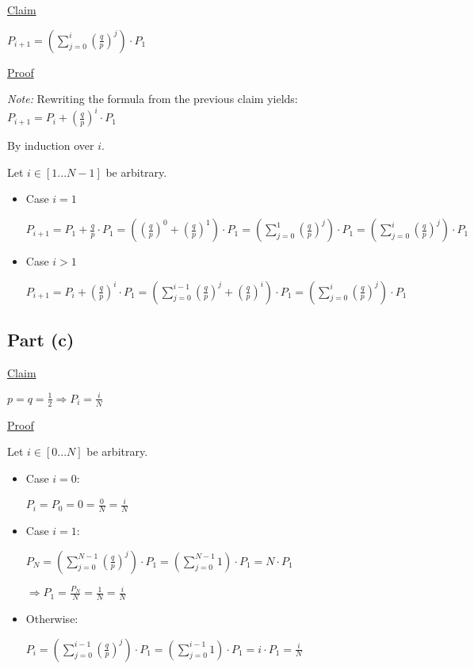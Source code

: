 \underline{Claim}

$P_{i + 1} = \left( \sum\limits_{j = 0}^i \left(\frac{q}{p}\right)^j \right) \cdot P_1$

\underline{Proof}

\textit{Note:} Rewriting the formula from the previous claim yields: $P_{i + 1} = P_i + \left(\frac{q}{p}\right)^i \cdot P_1$

By induction over $i$. 


Let $i \in [1...N - 1]$ be arbitrary.


\begin{itemize}
    \item Case $i = 1$
    
    $P_{i + 1} 
    = P_1 + \frac{q}{p} \cdot P_1
    = \left( \left(\frac{q}{p}\right)^0 + \left(\frac{q}{p}\right)^1 \right) \cdot P_1
    = \left( \sum\limits_{j = 0}^1 \left(\frac{q}{p}\right)^j \right) \cdot P_1
    = \left( \sum\limits_{j = 0}^i \left(\frac{q}{p}\right)^j \right) \cdot P_1$
    
    \item Case $i > 1$
    
    $P_{i + 1} 
    = P_i + \left(\frac{q}{p}\right)^i \cdot P_1
    = \left( \sum\limits_{j = 0}^{i - 1} \left(\frac{q}{p}\right)^j + \left(\frac{q}{p}\right)^i \right) \cdot P_1
    = \left( \sum\limits_{j = 0}^i \left(\frac{q}{p}\right)^j \right) \cdot P_1$
    
\end{itemize}


\subsection*{Part (c)}

\underline{Claim}

$p = q = \frac{1}{2} \Rightarrow P_i = \frac{i}{N}$

\underline{Proof}

Let $i \in [0...N]$ be arbitrary.

\begin{itemize}
    \item Case $i = 0$: 
    
    $P_i = P_0 = 0 = \frac{0}{N} = \frac{i}{N}$ 

    \item Case $i = 1$: 
    
    $P_N 
    = \left(\sum\limits_{j = 0}^{N - 1} \left(\frac{q}{p}\right)^j \right) \cdot P_1
    = \left(\sum\limits_{j = 0}^{N - 1} 1 \right) \cdot P_1
    = N \cdot P_1$

    
    $\Rightarrow 
    P_1 = \frac{P_N}{N} = \frac{1}{N} = \frac{i}{N}$ 
    
    \item Otherwise:
    
    $P_i 
    = \left(\sum\limits_{j = 0}^{i - 1} \left(\frac{q}{p}\right)^j \right) \cdot P_1
    = \left(\sum\limits_{j = 0}^{i - 1} 1 \right) \cdot P_1
    = i  \cdot P_1
    = \frac{i}{N}$ 
    \end{itemize}


